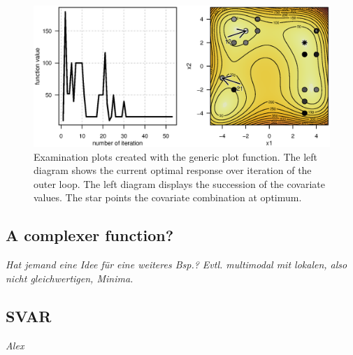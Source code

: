 \begin{figure}[htbp]
	\centering
	\includegraphics[width=1.025\textwidth]{Fig/fig2-ex2-plot.eps}
	\caption{Examination plots created with the generic plot function. The left diagram shows the current optimal response over iteration of the outer loop. The left diagram displays the succession of the covariate values. The star points the covariate combination at optimum.}
	\label{fig:fig2}
\end{figure}

\subsection{A complexer function?}
\textit{Hat jemand eine Idee für eine weiteres Bsp.? Evtl. multimodal mit lokalen, also nicht gleichwertigen, Minima.}

\subsection{SVAR}
\textit{Alex}

